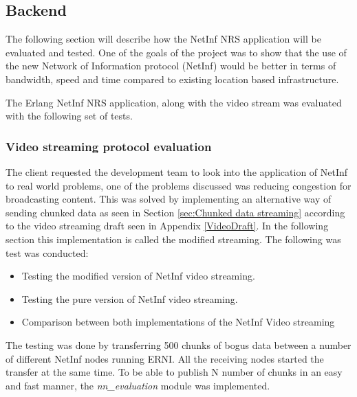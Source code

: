 \subsection{Backend}

The following section will describe how the NetInf NRS application will be evaluated and tested. One of the goals of the project was to show that the use of the new Network of Information protocol (NetInf) would be better in terms of bandwidth, speed and time compared to existing location based infrastructure. 

The Erlang NetInf NRS application, along with the video stream was evaluated with the following set of tests. 


\subsubsection{Video streaming protocol evaluation}
The client requested the development team to look into the application of NetInf to real world problems, one of the problems discussed was reducing congestion for broadcasting content. This was solved by implementing an alternative way of sending chunked data as seen in Section \ref{sec:Chunked data streaming} according to the video streaming draft seen in Appendix \ref{VideoDraft}. In the following section this implementation is called the modified streaming. The following was test was conducted:

\begin{itemize}
\item Testing the modified version of NetInf video streaming. 
\item Testing the pure version of NetInf video streaming.
\item Comparison between both implementations of the NetInf Video streaming
\end{itemize}

The testing was done by transferring 500 chunks of bogus data between a number of different NetInf nodes running ERNI. All the receiving nodes started the transfer at the same time. To be able to publish N number of chunks in an easy and fast manner, the \textit{nn\_evaluation} module was implemented.



